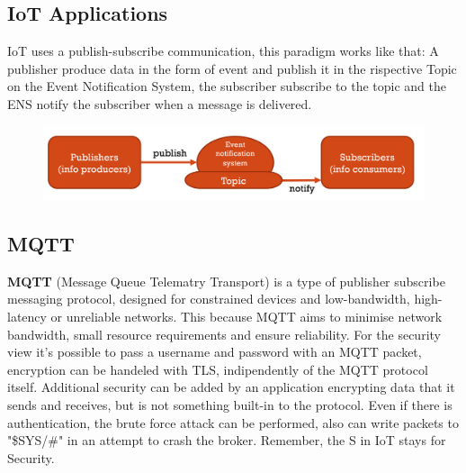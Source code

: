 \subsection{IoT Applications}
IoT uses a publish-subscribe communication, this paradigm works like that: A publisher produce data in the form of event and publish it in the rispective Topic on the Event Notification System, the subscriber subscribe to the topic and the ENS notify the subscriber when a message is delivered.
\begin{figure}[h!]
    \centering
    \includegraphics[scale=0.35]{images/publishersub.png}
\end{figure}
\FloatBarrier

\subsection{MQTT}
\textbf{MQTT} (Message Queue Telematry Transport) is a type of publisher subscribe messaging protocol, designed for constrained devices and low-bandwidth, high-latency or unreliable networks. This because MQTT aims to minimise network bandwidth, small resource requirements and ensure reliability. For the security view it's possible to pass a username and password with an MQTT packet, encryption can be handeled with TLS, indipendently of the MQTT protocol itself. Additional security can be added by an application encrypting data that it sends and receives, but is not something built-in to the protocol. Even if there is authentication, the brute force attack can be performed, also can write packets to "\$SYS/#" in an attempt to crash the broker. Remember, the S in IoT stays for Security.